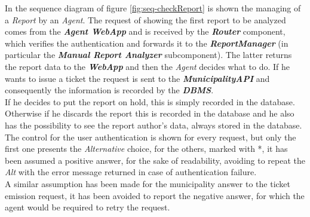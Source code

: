 \documentclass[a4paper]{report}
\begin{document}
In the sequence diagram of figure \ref{fig:seq-checkReport} is shown the managing of a \textit{Report} by an \textit{Agent}. The request of showing the first report to be analyzed comes from the \textit{\textbf{Agent WebApp}} and is received by the \textit{\textbf{Router}} component, which verifies the authentication and forwards it to the \textit{\textbf{ReportManager}} (in particular the \textit{\textbf{Manual Report Analyzer}} subcomponent). The latter returns the report data to the \textit{\textbf{WebApp}} and then the \textit{Agent} decides what to do. If he wants to issue a ticket the request is sent to the \textit{\textbf{MunicipalityAPI}} and consequently the information is recorded by the \textit{\textbf{DBMS}}.\\
If he decides to put the report on hold, this is simply recorded in the database.
Otherwise if he discards the report this is recorded in the database and he also has the possibility to see the report author's data, always stored in the database.\\
The control for the user authentication is shown for every request, but only the first one presents the \textit{Alternative} choice, for the others, marked with *, it has been assumed a positive answer, for the sake of readability, avoiding to repeat the \textit{Alt} with the error message returned in case of authentication failure. \\
A similar assumption has been made for the municipality answer to the ticket emission request, it has been avoided to report the negative answer, for which the agent would be required to retry the request.
\end{document}
